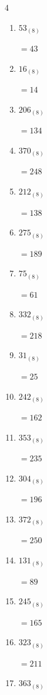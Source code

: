 \begin{multicols}{4}
\begin{enumerate}
  \item $53_{(8)}$

        $=43$

  \item $16_{(8)}$

        $=14$

  \item $206_{(8)}$

        $=134$

  \item $370_{(8)}$

        $=248$

  \item $212_{(8)}$

        $=138$

  \item $275_{(8)}$

        $=189$

  \item $75_{(8)}$

        $=61$

  \item $332_{(8)}$

        $=218$

  \item $31_{(8)}$

        $=25$

  \item $242_{(8)}$

        $=162$

  \item $353_{(8)}$

        $=235$

  \item $304_{(8)}$

        $=196$

  \item $372_{(8)}$

        $=250$

  \item $131_{(8)}$

        $=89$

\columnbreak %

  \item $245_{(8)}$

        $=165$

  \item $323_{(8)}$

        $=211$

  \item $363_{(8)}$


\end{enumerate}
\end{multicols}
